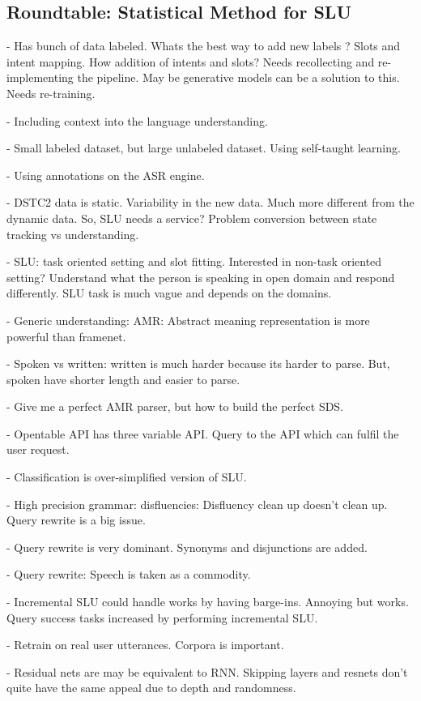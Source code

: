 \documentclass[12pt]{article}
\begin{document}
\subsection{Roundtable: Statistical Method for SLU}

- Has bunch of data labeled. Whats the best way to add new labels ? Slots and intent mapping. How addition of intents and slots? Needs recollecting and re-implementing the pipeline. May be generative models can be a solution to this. Needs re-training.

- Including context into the language understanding.

- Small labeled dataset, but large unlabeled dataset. Using self-taught learning.

- Using annotations on the ASR engine.

- DSTC2 data is static. Variability in the new data. Much more different from the dynamic data. So, SLU needs a service? Problem conversion between state tracking vs understanding.

- SLU: task oriented setting and slot fitting. Interested in non-task oriented setting? Understand what the person is speaking in open domain and respond differently. SLU task is much vague and depends on the domains.

- Generic understanding: AMR: Abstract meaning representation is more powerful than framenet.

- Spoken vs written: written is much harder because its harder to parse. But, spoken have shorter length and easier to parse.

- Give me a perfect AMR parser, but how to build the perfect SDS.

- Opentable API has three variable API. Query to the API which can fulfil the user request.

- Classification is over-simplified version of SLU.

- High precision grammar: disfluencies: Disfluency clean up doesn’t clean up. Query rewrite is a big issue.

- Query rewrite is very dominant. Synonyms and disjunctions are added.

- Query rewrite: Speech is taken as a commodity.

- Incremental SLU could handle works by having barge-ins. Annoying but works. Query success tasks increased by performing incremental SLU.

- Retrain on real user utterances. Corpora is important.

- Residual nets are may be equivalent to RNN. Skipping layers and resnets don’t quite have the same appeal due to depth and randomness.
\end{document}
